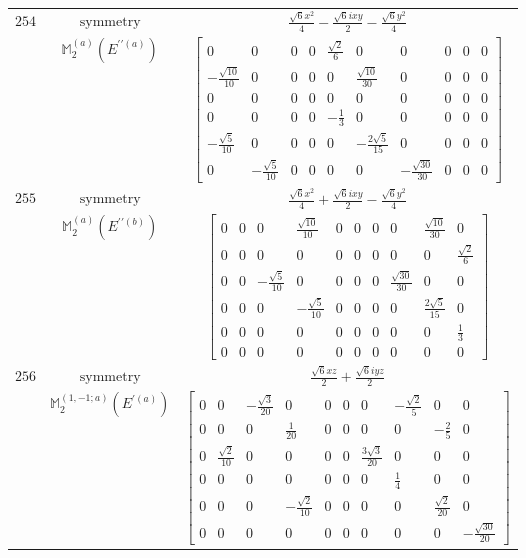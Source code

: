 \documentclass[fleqn,8pt,landscape]{jsarticle}
\begin{document}
\begin{longtable}{ccc}
$ 254 $ & $ \text{symmetry} $ & $ \frac{\sqrt{6} x^{2}}{4} - \frac{\sqrt{6} i x y}{2} - \frac{\sqrt{6} y^{2}}{4} $ \\
$  $ & $ \mathbb{M}_{2}^{(a)}(E^{\prime\prime(a)}) $ & $ \begin{bmatrix} 0 & 0 & 0 & 0 & \frac{\sqrt{2}}{6} & 0 & 0 & 0 & 0 & 0 \\ - \frac{\sqrt{10}}{10} & 0 & 0 & 0 & 0 & \frac{\sqrt{10}}{30} & 0 & 0 & 0 & 0 \\ 0 & 0 & 0 & 0 & 0 & 0 & 0 & 0 & 0 & 0 \\ 0 & 0 & 0 & 0 & - \frac{1}{3} & 0 & 0 & 0 & 0 & 0 \\ - \frac{\sqrt{5}}{10} & 0 & 0 & 0 & 0 & - \frac{2 \sqrt{5}}{15} & 0 & 0 & 0 & 0 \\ 0 & - \frac{\sqrt{5}}{10} & 0 & 0 & 0 & 0 & - \frac{\sqrt{30}}{30} & 0 & 0 & 0 \end{bmatrix} $ \\ \hline
$ 255 $ & $ \text{symmetry} $ & $ \frac{\sqrt{6} x^{2}}{4} + \frac{\sqrt{6} i x y}{2} - \frac{\sqrt{6} y^{2}}{4} $ \\
$  $ & $ \mathbb{M}_{2}^{(a)}(E^{\prime\prime(b)}) $ & $ \begin{bmatrix} 0 & 0 & 0 & \frac{\sqrt{10}}{10} & 0 & 0 & 0 & 0 & \frac{\sqrt{10}}{30} & 0 \\ 0 & 0 & 0 & 0 & 0 & 0 & 0 & 0 & 0 & \frac{\sqrt{2}}{6} \\ 0 & 0 & - \frac{\sqrt{5}}{10} & 0 & 0 & 0 & 0 & \frac{\sqrt{30}}{30} & 0 & 0 \\ 0 & 0 & 0 & - \frac{\sqrt{5}}{10} & 0 & 0 & 0 & 0 & \frac{2 \sqrt{5}}{15} & 0 \\ 0 & 0 & 0 & 0 & 0 & 0 & 0 & 0 & 0 & \frac{1}{3} \\ 0 & 0 & 0 & 0 & 0 & 0 & 0 & 0 & 0 & 0 \end{bmatrix} $ \\ \hline
$ 256 $ & $ \text{symmetry} $ & $ \frac{\sqrt{6} x z}{2} + \frac{\sqrt{6} i y z}{2} $ \\
$  $ & $ \mathbb{M}_{2}^{(1,-1;a)}(E^{\prime(a)}) $ & $ \begin{bmatrix} 0 & 0 & - \frac{\sqrt{3}}{20} & 0 & 0 & 0 & 0 & - \frac{\sqrt{2}}{5} & 0 & 0 \\ 0 & 0 & 0 & \frac{1}{20} & 0 & 0 & 0 & 0 & - \frac{2}{5} & 0 \\ 0 & \frac{\sqrt{2}}{10} & 0 & 0 & 0 & 0 & \frac{3 \sqrt{3}}{20} & 0 & 0 & 0 \\ 0 & 0 & 0 & 0 & 0 & 0 & 0 & \frac{1}{4} & 0 & 0 \\ 0 & 0 & 0 & - \frac{\sqrt{2}}{10} & 0 & 0 & 0 & 0 & \frac{\sqrt{2}}{20} & 0 \\ 0 & 0 & 0 & 0 & 0 & 0 & 0 & 0 & 0 & - \frac{\sqrt{30}}{20} \end{bmatrix} $ \\ \hline

\end{longtable}
\end{document}
